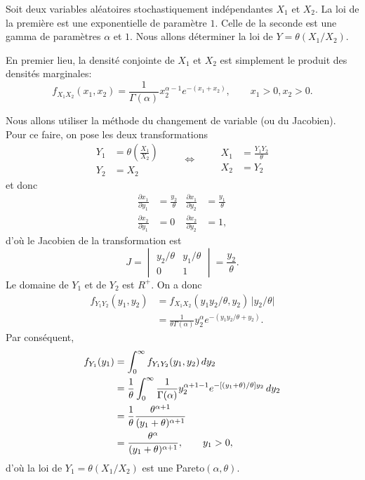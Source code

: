 \documentclass[11pt,article,french]{memoir}
\begin{document}
Soit deux variables aléatoires stochastiquement indépendantes $X_1$ et
$X_2$. La loi de la première est une exponentielle de paramètre $1$.
Celle de la seconde est une gamma de paramètres $\alpha$ et $1$. Nous
allons déterminer la loi de $Y = \theta (X_1/X_2)$.

En premier lieu, la densité conjointe de $X_1$ et $X_2$ est
simplement le produit des densités marginales:
\begin{equation*}
  f_{X_1 X_2}(x_1, x_2) = \frac{1}{\Gamma(\alpha)}
  x_2^{\alpha - 1} e^{-(x_1 + x_2)}, \qquad
  x_1 > 0, x_2 > 0.
\end{equation*}

Nous allons utiliser la méthode du changement de variable (ou du
Jacobien). Pour ce faire, on pose les deux transformations
\begin{equation*}
  \begin{aligned}
    Y_1 &= \theta \left( \frac{X_1}{X_2} \right) \\
    Y_2 &= X_2
  \end{aligned}
  \qquad \Leftrightarrow \qquad
  \begin{aligned}
    X_1 &= \frac{Y_1 Y_2}{\theta} \\
    X_2 &= Y_2
  \end{aligned}
\end{equation*}
et donc
\begin{align*}
  \frac{\partial x_1}{\partial y_1} &= \frac{y_2}{\theta} &
  \frac{\partial x_1}{\partial y_2} &= \frac{y_1}{\theta} \\
  \frac{\partial x_2}{\partial y_1} &= 0 &
  \frac{\partial x_2}{\partial y_2} &= 1,
\end{align*}
d'où le Jacobien de la transformation est
\begin{equation*}
  J =
  \begin{vmatrix}
    y_2/\theta & y_1/\theta \\
    0 & 1
  \end{vmatrix}
  = \frac{y_2}{\theta}.
\end{equation*}
Le domaine de $Y_1$ et de $Y_2$ est $R^+$. On a donc
\begin{align*}
  f_{Y_1 Y_2}(y_1, y_2)
  &= f_{X_1 X_2}(y_1 y_2/\theta, y_2)\, \lvert y_2/\theta \rvert \\
  &= \frac{1}{\theta \Gamma(\alpha)} y_2^\alpha
    e^{-(y_1 y_2/\theta + y_2)}.
\end{align*}
Par conséquent,
\begin{align*}
  f_{Y_1}(y_1)
  &= \int_0^\infty f_{Y_1 Y_2}(y_1, y_2)\, dy_2 \\
  &= \frac{1}{\theta} \int_0^\infty
    \frac{1}{\Gamma(\alpha)} y_2^{\alpha + 1 - 1}
    e^{-[(y_1 + \theta)/\theta] y_2}\, dy_2 \\
  &= \frac{1}{\theta}
    \frac{\theta^{\alpha + 1}}{(y_1 + \theta)^{\alpha + 1}} \\
  &= \frac{\theta^\alpha}{%
    (y_1 + \theta)^{\alpha + 1}}, \qquad y_1 > 0,
\end{align*}
d'où la loi de $Y_1 = \theta (X_1/X_2)$ est une Pareto$(\alpha, \theta)$.
\end{document}
